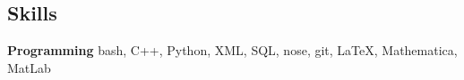 \documentclass[margin,line]{resume}
\begin{document}
\begin{resume}
    \section{\mysidestyle Skills}
                \textbf{Programming} \hfill bash, C++, Python, XML, SQL, nose, git, \LaTeX, Mathematica, MatLab\vspace{.5mm}\\%
                




\end{resume}
\end{document}
